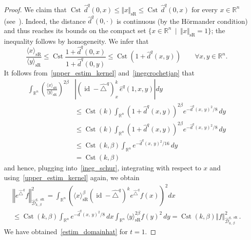 \documentclass[AHL,Unicode,published]{cedram}
\newcommand*\R{\mathbb{R}}
\newcommand{\calD}{\mathcal{D}}
\DeclareMathOperator{\Cst}{Cst}
\DeclareMathOperator{\id}{id}
\DeclareMathOperator{\sR}{sR}
\renewcommand{\leq}{\leqslant}
\let\oldforall\forall
\renewcommand*{\forall}{\mathrel{\oldforall}}
\begin{document}
\begin{proof}
We claim that $\Cst\, \widehat{d}^q(0,x)\leq \Vert x\Vert_{\sR} \leq \Cst\, \widehat{d}^q(0,x)$ for every $x\in\R^n$ (see~\cite[Lemma~2.1 p.~28]{Jean_2014}). Indeed, the distance $\widehat{d}^q(0,\cdot)$ is continuous (by the H\"ormander condition) and thus reaches its bounds on the compact set $\{x\in\R^n\ \mid\ \Vert x\Vert_{\sR}=1\}$; the inequality follows by homogeneity. We infer that
\begin{equation}\label{inegcrochetjap}
\frac{\langle x\rangle_{\sR}}{\langle y\rangle_{\sR}} \leq \Cst \frac{1+\widehat{d}^q(0,x)}{1+\widehat{d}^q(0,y)} \leq \Cst \left(1+\widehat{d}^q(x,y)\right) \qquad\forall x,y\in\R^n.
\end{equation}
It follows from~\eqref{upper_estim_kernel} and~\eqref{inegcrochetjap} that
\begin{align*}
\int_{\R^n} \left(\frac{\langle x\rangle_{\sR}}{\langle y\rangle_{\sR}} \right)^{2\beta} &\left\vert \left(\id - \widehat{\triangle}^q\right)_x^k\, \widehat{e}^q(1,x,y) \right\vert dy
\\
&\leq \Cst(k) \int_{\R^n} \left(1+\widehat{d}^q(x,y)\right)^{2\beta} e^{-\widehat{d}^q(x,\,y)^2/8} \, dy \\
&\leq \Cst(k) \int_{\R^n} \left(1+\widehat{d}^q(x,y)\right)^{2\beta} e^{-\widehat{d}^q(x,\,y)^2/8} \, dy\\
&\leq \Cst(k,\beta) \int_{\R^n} e^{-\widehat{d}^q(x,\,y)^2/16} \, dy\\
&=\Cst(k,\beta)
\end{align*}
and hence, plugging into~\eqref{ineg_schur}, integrating with respect to $x$ and using~\eqref{upper_estim_kernel} again, we obtain
\begin{multline}\label{estim_for_t1}
\left\Vert e^{\widehat{\triangle}^q} f \right\Vert_{\widehat{\calD}^{q,\,\sR}_{k,\,\beta}}^2 = \int_{\R^n} \left(\langle x\rangle_{\sR}^\beta \left(\id - \widehat{\triangle}^q\right)^k e^{\widehat{\triangle}^q} f(x) \right)^2 dx \\
\leq \Cst(k,\beta) \int_{\R^n} e^{-\widehat{d}^q(x,\,y)^2/8} \, dx \int_{\R^n} \langle y\rangle_{\sR}^{2\beta} f(y)^2\, dy = \Cst(k,\beta) \left\Vert f \right\Vert_{\widehat{\calD}^{q,\,\sR}_{0,\,\beta}}^2.
\end{multline}
We have obtained~\eqref{estim_domainhat} for $t=1$.


\end{proof}
\end{document}
